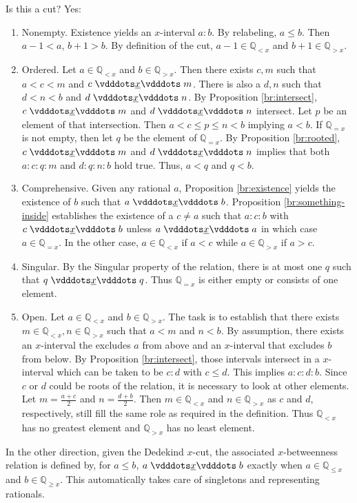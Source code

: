\documentclass[12pt]{article}
\newcommand{\qcut}[2][x]{\ensuremath{\mathbb{Q}_{#2 #1}}}
\newcommand{\qlt}[1][x]{\qcut[#1]{<}}
\newcommand{\qeq}[1][x]{\qcut[#1]{=}}
\newcommand{\qgt}[1][x]{\qcut[#1]{>}}
\newcommand{\qgeq}[1][x]{\qcut[#1]{\geq}}
\newcommand{\qleq}[1][x]{\qcut[#1]{\leq}}
\begin{document}
Is this a cut? Yes: 
\begin{enumerate}
    \item Nonempty. Existence yields an $x$-interval $a:b$. By relabeling, $a \leq b$. Then $a-1< a$, $b+1 > b$. By definition of the cut, $a-1 \in \qlt$ and $b+1 \in \qgt$.
    \item Ordered. Let $a \in \qlt$ and $b \in \qgt$.  Then there exists $c, m$ such that $a < c < m$ and $c \xrel m$. There is also a $d, n$ such that $d < n< b$  and $d \xrel n$. By Proposition \ref{br:intersect}, $c \xrel m$ and $d \xrel n$ intersect. Let $p$ be an element of that intersection. Then $a < c \leq p \leq n < b$ implying $a < b$.  If $\qeq$ is not empty, then let $q$ be the element of $\qeq$. By Proposition \ref{br:rooted}, $c \xrel m$ and $d \xrel n$ implies that both $a:c:q:m$ and $d:q:n:b$ hold true. Thus, $a < q$ and $q < b$.  
    \item Comprehensive. Given any rational $a$, Proposition \ref{br:existence} yields the existence of $b$ such that $a \xrel b$. Proposition \ref{br:something-inside} establishes the existence of a $c \neq a$ such that $a:c:b$ with $c \xrel b$ unless $a \xrel a$ in which case $a \in \qeq$. In the other case, $a \in \qlt$ if $a < c$ while $a  \in \qgt$ if $a > c$. 
    \item Singular. By the Singular property of the relation, there is at most one $q$ such that $q \xrel q$. Thus $\qeq$ is either empty or consists of one element. 
    \item Open. Let $a\in \qlt$ and $b \in \qgt$. The task is to establish that there exists $m \in \qlt, n \in \qgt$ such that $a < m$ and $n < b$. By assumption, there exists an $x$-interval the excludes $a$ from above and an $x$-interval that excludes $b$ from below. By Proposition \ref{br:intersect}, those intervals intersect in a $x$-interval which can be taken to be $c:d$ with $c \leq d$. This implies $a:c:d:b$. Since $c$ or $d$ could be roots of the relation, it is necessary to look at other elements. Let $m = \frac{a+c}{2}$ and $n = \frac{d+b}{2}$. Then $m \in \qlt$ and $n \in \qgt$ as $c$ and $d$, respectively, still fill the same role as required in the definition. Thus $\qlt$ has no greatest element and $\qgt$ has no least element. 
\end{enumerate}

In the other direction, given the Dedekind $x$-cut, the associated $x$-betweenness relation is defined by, for $a \leq b$, $a \xrel b$ exactly when $a \in \qleq$ and $b \in \qgeq$. This automatically takes care of singletons and representing rationals. 
\end{document}
